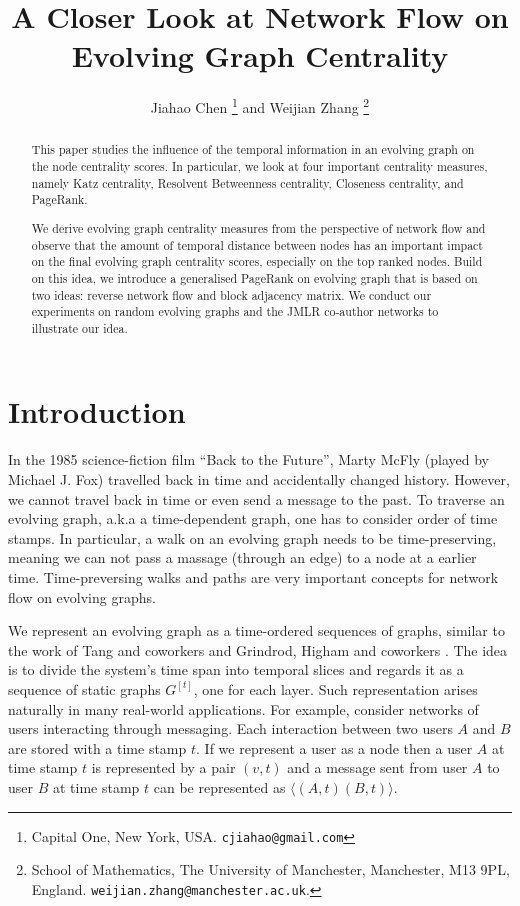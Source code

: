 \documentclass[12pt]{article}
\title{A Closer Look at Network Flow on Evolving Graph Centrality}
\author{Jiahao Chen \thanks{
Capital One,
New York, USA.
\texttt{cjiahao@gmail.com}
}
 and
Weijian Zhang
\thanks{%
  School of Mathematics,
The University of Manchester,
                Manchester, M13 9PL, England.
\texttt{weijian.zhang@manchester.ac.uk}.
}
}
\theoremstyle{definition}
\begin{document}


\maketitle

\begin{abstract}
This paper studies the influence of the temporal information in an evolving graph on the node centrality scores.
In particular, we look at four important centrality measures, namely Katz centrality,
Resolvent Betweenness centrality, Closeness centrality, and PageRank.

We derive evolving graph centrality measures from the perspective of network flow and
observe that the amount of temporal distance between nodes has an important impact on the final evolving graph centrality scores, especially on the top ranked nodes.
Build on this idea, we introduce a generalised PageRank on evolving graph that is based on two ideas:
reverse network flow and block adjacency matrix.
We conduct our experiments on random evolving graphs and the JMLR co-author networks to illustrate our idea.
\end{abstract}

\section{Introduction}
\label{sec:introduction}

In the 1985 science-fiction film ``Back to the Future'', Marty McFly (played by Michael J. Fox) travelled back in time and accidentally changed history.
However, we cannot travel back in time or even send a message to the past.
To traverse an evolving graph, a.k.a a time-dependent graph, one has to consider order of time stamps. In particular, a walk on an evolving graph needs to be time-preserving, meaning we
can not pass a massage (through an edge) to a node at a earlier time.
Time-preversing walks and paths are very important concepts for
network flow on evolving graphs.

We represent an evolving graph as a time-ordered sequences of graphs, similar to the work of Tang and coworkers \cite{nicosia13, tang09, tang102, tang10} and Grindrod, Higham and coworkers \cite{grindrod13,grindrod11}. The idea is to divide the system's time span into temporal slices and regards it as a sequence of static graphs $G^{[t]}$, one for each layer. Such representation arises naturally in many real-world applications. For example,
consider networks of users interacting through messaging. Each interaction between two users $A$ and $B$ are stored with a time stamp $t$. If we represent a user as a node then a user $A$ at time stamp $t$ is represented by a pair $(v,t)$ and a message sent from user $A$ to user $B$ at time stamp $t$ can be represented as $\langle (A, t) (B, t) \rangle$.
\end{document}
